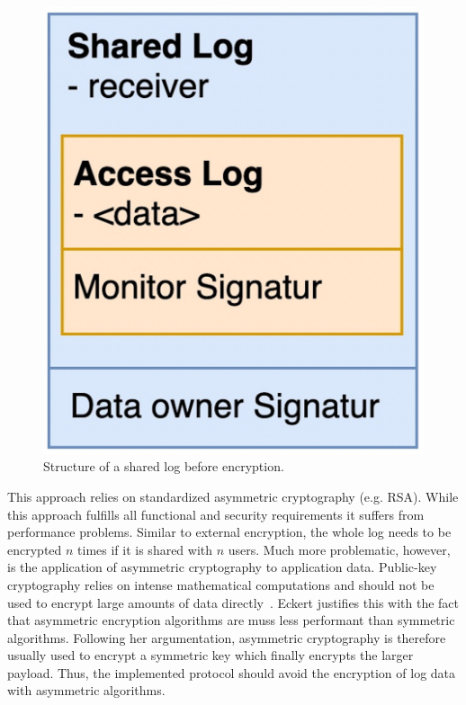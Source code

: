 \documentclass[../main.tex]{subfiles}
\begin{document}
\begin{figure}[ht]
    \includegraphics[scale=0.12]{../img/04/mutual_encryption.jpg}
    \centering
    \caption{Structure of a shared log before encryption.}
    \label{fig:mutual_encryption}
\end{figure}

This approach relies on standardized asymmetric cryptography (e.g. RSA).
While this approach fulfills all functional and security requirements it suffers from performance problems.
Similar to external encryption, the whole log needs to be encrypted $n$ times if it is shared with $n$ users.
Much more problematic, however, is the application of asymmetric cryptography to application data.
Public-key cryptography relies on intense mathematical computations and should not be used to encrypt large amounts of data directly~\cite[340]{Eckert2018}.
Eckert justifies this with the fact that asymmetric encryption algorithms are muss less performant than symmetric algorithms.
Following her argumentation, asymmetric cryptography is therefore usually used to encrypt a symmetric key which finally encrypts the larger payload.
Thus, the implemented protocol should avoid the encryption of log data with asymmetric algorithms.
\end{document}
